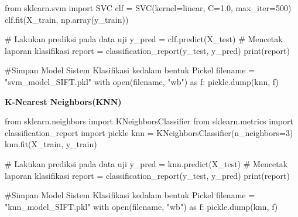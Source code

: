 \documentclass[
  letterpaper,
  DIV=11,
  numbers=noendperiod]{scrreprt}
\newenvironment{Shaded}{\begin{snugshade}}{\end{snugshade}}
\newcommand{\BuiltInTok}[1]{\textcolor[rgb]{0.00,0.23,0.31}{#1}}
\newcommand{\CommentTok}[1]{\textcolor[rgb]{0.37,0.37,0.37}{#1}}
\newcommand{\ControlFlowTok}[1]{\textcolor[rgb]{0.00,0.23,0.31}{#1}}
\newcommand{\DecValTok}[1]{\textcolor[rgb]{0.68,0.00,0.00}{#1}}
\newcommand{\FloatTok}[1]{\textcolor[rgb]{0.68,0.00,0.00}{#1}}
\newcommand{\ImportTok}[1]{\textcolor[rgb]{0.00,0.46,0.62}{#1}}
\newcommand{\NormalTok}[1]{\textcolor[rgb]{0.00,0.23,0.31}{#1}}
\newcommand{\OperatorTok}[1]{\textcolor[rgb]{0.37,0.37,0.37}{#1}}
\newcommand{\StringTok}[1]{\textcolor[rgb]{0.13,0.47,0.30}{#1}}
\begin{document}
\begin{Shaded}
\begin{Highlighting}[]
\ImportTok{from}\NormalTok{ sklearn.svm }\ImportTok{import}\NormalTok{ SVC}
\NormalTok{clf }\OperatorTok{=}\NormalTok{ SVC(kernel}\OperatorTok{=}\StringTok{\textquotesingle{}linear\textquotesingle{}}\NormalTok{, C}\OperatorTok{=}\FloatTok{1.0}\NormalTok{, max\_iter}\OperatorTok{=}\DecValTok{500}\NormalTok{)}
\NormalTok{clf.fit(X\_train, np.array(y\_train))}

\CommentTok{\# Lakukan prediksi pada data uji}
\NormalTok{y\_pred }\OperatorTok{=}\NormalTok{ clf.predict(X\_test)}
\CommentTok{\# Mencetak laporan klasifikasi}
\NormalTok{report }\OperatorTok{=}\NormalTok{ classification\_report(y\_test, y\_pred)}
\BuiltInTok{print}\NormalTok{(report)}

\CommentTok{\#Simpan Model Sistem Klasifikasi kedalam bentuk Pickel}
\NormalTok{filename }\OperatorTok{=} \StringTok{"svm\_model\_SIFT.pkl"}
\ControlFlowTok{with} \BuiltInTok{open}\NormalTok{(filename, }\StringTok{"wb"}\NormalTok{) }\ImportTok{as}\NormalTok{ f:}
\NormalTok{    pickle.dump(knn, f)}
\end{Highlighting}
\end{Shaded}

\textbf{K-Nearest Neighbors(KNN)}

\begin{Shaded}
\begin{Highlighting}[]
\ImportTok{from}\NormalTok{ sklearn.neighbors }\ImportTok{import}\NormalTok{ KNeighborsClassifier}
\ImportTok{from}\NormalTok{ sklearn.metrics }\ImportTok{import}\NormalTok{ classification\_report}
\ImportTok{import}\NormalTok{ pickle}
\NormalTok{knn }\OperatorTok{=}\NormalTok{ KNeighborsClassifier(n\_neighbors}\OperatorTok{=}\DecValTok{3}\NormalTok{)}
\NormalTok{knn.fit(X\_train, y\_train)}

\CommentTok{\# Lakukan prediksi pada data uji}
\NormalTok{y\_pred }\OperatorTok{=}\NormalTok{ knn.predict(X\_test)}
\CommentTok{\# Mencetak laporan klasifikasi}
\NormalTok{report }\OperatorTok{=}\NormalTok{ classification\_report(y\_test, y\_pred)}
\BuiltInTok{print}\NormalTok{(report)}

\CommentTok{\#Simpan Model Sistem Klasifikasi kedalam bentuk Pickel}
\NormalTok{filename }\OperatorTok{=} \StringTok{"knn\_model\_SIFT.pkl"}
\ControlFlowTok{with} \BuiltInTok{open}\NormalTok{(filename, }\StringTok{"wb"}\NormalTok{) }\ImportTok{as}\NormalTok{ f:}
\NormalTok{    pickle.dump(knn, f)}
\end{Highlighting}
\end{Shaded}
\end{document}
